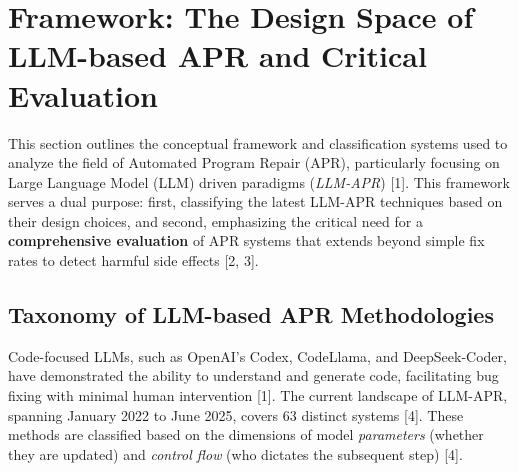 \section{Framework: The Design Space of LLM-based APR and Critical Evaluation}
\label{sec:framework}

This section outlines the conceptual framework and classification systems used to analyze the field of Automated Program Repair (APR), particularly focusing on Large Language Model (LLM) driven paradigms (\emph{LLM-APR}) [1]. This framework serves a dual purpose: first, classifying the latest LLM-APR techniques based on their design choices, and second, emphasizing the critical need for a \textbf{comprehensive evaluation} of APR systems that extends beyond simple fix rates to detect harmful side effects [2, 3].

\subsection{Taxonomy of LLM-based APR Methodologies}
\label{ssec:taxonomy}

Code-focused LLMs, such as OpenAI's Codex, CodeLlama, and DeepSeek-Coder, have demonstrated the ability to understand and generate code, facilitating bug fixing with minimal human intervention [1]. The current landscape of LLM-APR, spanning January 2022 to June 2025, covers 63 distinct systems [4]. These methods are classified based on the dimensions of model \emph{parameters} (whether they are updated) and \emph{control flow} (who dictates the subsequent step) [4].

